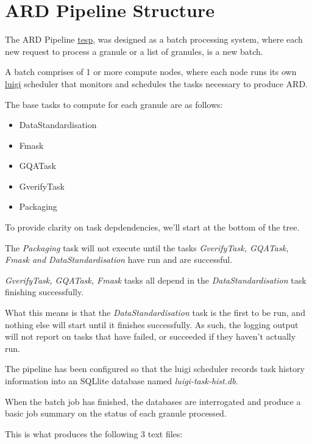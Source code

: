 \documentclass[a4paper,oneside,titlepage]{article}
\begin{document}
  \section{ARD Pipeline Structure}

    \begin{flushleft}
      The ARD Pipeline \href{https://github.com/OpenDataCubePipelines/tesp}{tesp}, was designed as a batch processing system, where each new request to process a granule or a list of granules, is a new batch. \par
      A batch comprises of 1 or more compute nodes, where each node runs its own \href{https://luigi.readthedocs.io/en/stable/}{luigi} scheduler that monitors and schedules the tasks necessary to produce ARD. \par
      The base tasks to compute for each granule are as follows:
    \end{flushleft}

    \begin{itemize}
      \item DataStandardisation
      \item Fmask
      \item GQATask
      \item GverifyTask
      \item Packaging
    \end{itemize}

    \begin{flushleft}
      To provide clarity on task depdendencies, we'll start at the bottom of the tree. \par
      The \textit{Packaging} task will not execute until the tasks \textit{GverifyTask, GQATask, Fmask and DataStandardisation} have run and are successful. \par
      \textit{GverifyTask, GQATask, Fmask} tasks all depend in the \textit{DataStandardisation} task finishing successfully. \par
      What this means is that the \textit{DataStandardisation} task is the first to be run, and nothing else will start until it finishes successfully. As such, the logging output will not report on tasks that have failed, or succeeded if they haven't actually run.
    \end{flushleft}

    \begin{flushleft}
      The pipeline has been configured so that the luigi scheduler records task history information into an SQLlite database named \textit{luigi-task-hist.db}. \par
      When the batch job has finished, the databases are interrogated and produce a basic job summary on the status of each granule processed. \par
      This is what produces the following 3 text files:
    \end{flushleft}
\end{document}
